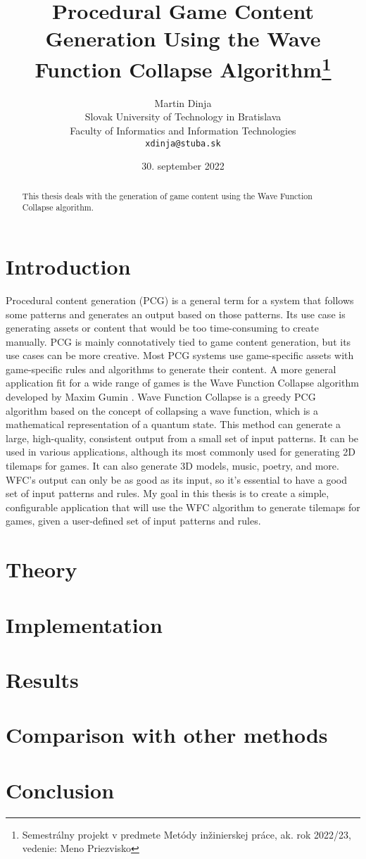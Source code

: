 \documentclass[10pt,twoside,a4paper]{article}
\title{Procedural Game Content Generation Using the Wave Function Collapse Algorithm\thanks{Semestrálny projekt v predmete Metódy inžinierskej práce, ak. rok 2022/23, vedenie: Meno Priezvisko}}
\author{Martin Dinja\\[2pt]
	{\small Slovak University of Technology in Bratislava}\\
	{\small Faculty of Informatics and Information Technologies}\\
	{\small \texttt{xdinja@stuba.sk}}
}
\date{\small 30. september 2022}
\begin{document}
\maketitle

\tableofcontents

\begin{abstract}
    \begin{center}
        This thesis deals with the generation of game content using the Wave Function Collapse algorithm. 
    \end{center}
\end{abstract}

\section{Introduction}\label{sec:introduction}

Procedural content generation (PCG) is a general term for a system that follows some patterns and generates an output based on those patterns.
Its use case is generating assets or content that would be too time-consuming to create manually.
PCG is mainly connotatively tied to game content generation, but its use cases can be more creative.
Most PCG systems use game-specific assets with game-specific rules and algorithms to generate their content.
A more general application fit for a wide range of games is the Wave Function Collapse algorithm developed by Maxim Gumin \cite{WFC}.
Wave Function Collapse is a greedy PCG algorithm based on the concept of collapsing a wave function, which is a mathematical representation of a quantum state.
This method can generate a large, high-quality, consistent output from a small set of input patterns.
It can be used in various applications, although its most commonly used for generating 2D tilemaps for games.
It can also generate 3D models, music, poetry, and more.
WFC's output can only be as good as its input, so it's essential to have a good set of input patterns and rules. 
My goal in this thesis is to create a simple, configurable application that will use the WFC algorithm to generate tilemaps for games, given a user-defined set of input patterns and rules.


\section{Theory}\label{sec:theory}
\cite{BL22}
\cite{CHF20}
\cite{KLL+19}
\cite{LRGC22}
\cite{NMBP20}
\section{Implementation}\label{sec:implementation}
\section{Results}\label{sec:results}
\section{Comparison with other methods}\label{sec:comparison}
\section{Conclusion}\label{sec:conclusion}



\end{document}
